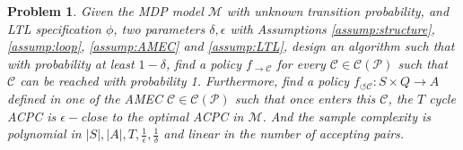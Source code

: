 \documentclass[journal]{IEEEtran}
\newtheorem{problem}{Problem}
\begin{document}
\begin{problem}\label{prob:unknown_problem}
	Given the MDP model $\mathcal{M}$ with unknown transition probability, and LTL specification $\phi$, two parameters $\delta,\epsilon$ with Assumptions \ref{assump:structure}, \ref{assump:loop}, \ref{assump:AMEC} and \ref{assump:LTL}, design an algorithm such that with probability at least $1-\delta$, find a policy $f_{\rightarrow\mathcal{C}}$ for every $\mathcal{C}\in\mathcal{C}(\mathcal{P})$ such that $\mathcal{C}$ can be reached with probability 1. Furthermore, find a policy $f_{\circlearrowleft\mathcal{C}} :S\times Q\rightarrow A$  defined in one of the AMEC $\mathcal{C}\in\mathcal{C}(\mathcal{P})$ such that once enters this $\mathcal{C}$, the $T$ cycle ACPC is $\epsilon-$close to the optimal ACPC in $\mathcal{M}$. And the sample complexity is polynomial in $|S|,|A|,T,\frac{1}{\epsilon},\frac{1}{\delta}$ and linear in the number of accepting pairs. 
\end{problem}
\end{document}
